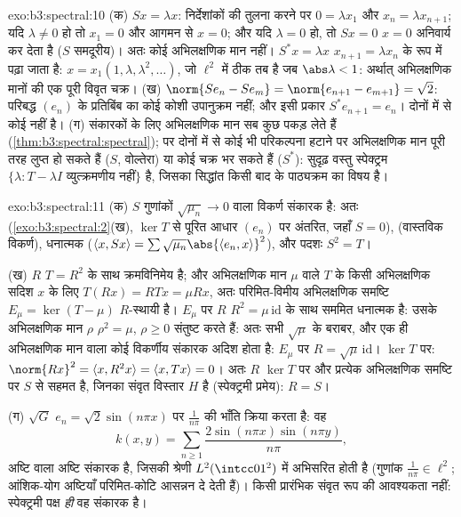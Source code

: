 \begin{solution}{exo:b3:spectral:10}
(क) $Sx = \lambda x$: निर्देशांकों की तुलना करने पर $0 = \lambda
x_1$ और $x_n = \lambda x_{n+1}$; यदि $\lambda \ne 0$
हो तो $x_1 = 0$ और आगमन से $x = 0$; और यदि $\lambda = 0$ हो, तो $Sx = 0$ $x = 0$ अनिवार्य
कर देता है ($S$ समदूरीय)। अतः कोई अभिलक्षणिक मान नहीं। $S^*x =
\lambda x$ $x_{n+1} = \lambda x_n$
के रूप में पढ़ा जाता है: $x =
x_1(1, \lambda, \lambda^2, \dots)$, जो $\ell^2$ में ठीक तब है जब $\abs\lambda < 1$:
अर्थात् अभिलक्षणिक मानों की एक पूरी विवृत चक्र।
(ख) $\norm{Se_n - Se_m} = \norm{e_{n+1} - e_{m+1}} = \sqrt2$: परिबद्ध $(e_n)$ के प्रतिबिंब का कोई कोशी उपानुक्रम नहीं;
और इसी प्रकार $S^*e_{n+1} = e_n$। दोनों में से कोई  नहीं है।
(ग)   संकारकों के लिए अभिलक्षणिक मान सब कुछ पकड़ लेते
हैं (\cref{thm:b3:spectral:spectral}); पर दोनों में से कोई भी परिकल्पना हटाने पर अभिलक्षणिक
मान पूरी तरह लुप्त हो सकते हैं ($S$, वोल्तेरा) या कोई चक्र भर
सकते हैं ($S^*$): सुदृढ़ वस्तु स्पेक्ट्रम $\{\lambda : T - \lambda I \text{ व्युत्क्रमणीय नहीं}\}$ है, जिसका सिद्धांत
किसी बाद के पाठ्यक्रम का विषय है।
\end{solution}

\begin{solution}{exo:b3:spectral:11}
(क) $S$ गुणांकों $\sqrt{\mu_n} \to 0$ वाला विकर्ण संकारक है: अतः  (\cref{exo:b3:spectral:2}(ख),
$\ker T$ से पूरित आधार $(e_n)$ पर अंतरित, जहाँ $S = 0$),  (वास्तविक
विकर्ण), धनात्मक ($\langle x, Sx\rangle =
\sum\sqrt{\mu_n}\abs{\langle e_n, x\rangle}^2$), और पदशः $S^2 =
T$।

(ख) $R$ $T = R^2$ के साथ क्रमविनिमेय है; और अभिलक्षणिक मान $\mu$ वाले
$T$ के किसी अभिलक्षणिक सदिश $x$ के लिए $T(Rx) = RTx = \mu Rx$, अतः परिमित-विमीय
अभिलक्षणिक समष्टि $E_\mu = \ker(T - \mu)$ $R$-स्थायी है। $E_\mu$ पर $R$ $R^2
= \mu\,\mathrm{id}$ के
साथ सममित धनात्मक है: उसके अभिलक्षणिक मान $\rho$ $\rho^2
= \mu$, $\rho \geq 0$ संतुष्ट
करते हैं: अतः सभी $\sqrt\mu$ के बराबर, और एक ही अभिलक्षणिक मान वाला कोई
विकर्णीय संकारक अदिश होता है: $E_\mu$ पर $R = \sqrt\mu\,\mathrm{id}$। $\ker T$ पर: $\norm
{Rx}^2 = \langle x, R^2x\rangle = \langle x, Tx\rangle = 0$। अतः
$R$ $\ker T$ पर और प्रत्येक अभिलक्षणिक समष्टि पर $S$ से सहमत है,
जिनका संवृत विस्तार $H$ है (स्पेक्ट्रमी प्रमेय): $R = S$।

(ग) $\sqrt G$ $e_n =
\sqrt2\sin(n\pi x)$ पर $\frac1{n\pi}$ की भाँति क्रिया करता है: वह
\[
k(x, y) = \sum_{n\geq1}\frac{2\sin(n\pi x)\sin(n\pi
y)}{n\pi},
\]
अष्टि वाला अष्टि संकारक है, जिसकी श्रेणी $L^2(\intcc01^2)$ में अभिसरित होती है
(गुणांक $\frac1{n\pi} \in \ell^2$; आंशिक-योग अष्टियाँ परिमित-कोटि आसन्नन दे देती हैं)।
किसी प्रारंभिक संवृत रूप की आवश्यकता नहीं: स्पेक्ट्रमी पक्ष \emph{ही}
वह संकारक है।
\end{solution}

